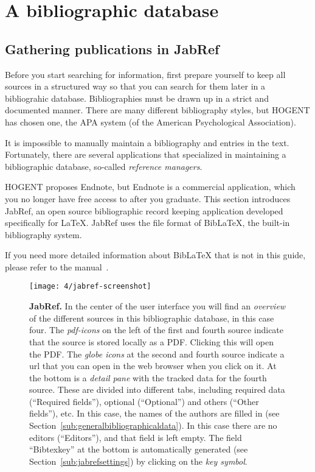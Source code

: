 \chapter{A bibliographic database}
\label{ch:bibliography}

\section{Gathering publications in JabRef}
\label{sec:publicationsjabref}

Before you start searching for information, first prepare yourself to keep all sources in a structured way so that you can search for them later in a bibliograhic database. Bibliographies must be drawn up in a strict and documented manner. There are many different bibliography styles, but HOGENT has chosen one, the APA system (of the American Psychological Association).

It is impossible to manually maintain a bibliography and entries in the text. Fortunately, there are several applications that specialized in maintaining a bibliographic database, so-called \emph{reference managers}.

HOGENT proposes Endnote, but Endnote is a commercial application, which you no longer have free access to after you graduate. This section introduces JabRef, an open source bibliographic record keeping application developed specifically for {\LaTeX}. JabRef uses the file format of Bib{\LaTeX}, the built-in bibliography system.

If you need more detailed information about Bib{\LaTeX} that is not in this guide, please refer to the manual~\autocite{LehmanEtAl2016}.

\begin{figure}
  \centering
  \texttt{[image: 4/jabref-screenshot]}
  \caption[JabRef]{\textbf{JabRef.} In the center of the user interface you will find an \emph{overview} of the different sources in this bibliographic database, in this case four. The \emph{pdf-icons} on the left of the first and fourth source indicate that the source is stored locally as a PDF. Clicking this will open the PDF. The \emph{globe icons} at the second and fourth source indicate a url that you can open in the web browser when you click on it. At the bottom is a \emph{detail pane} with the tracked data for the fourth source. These are divided into different tabs, including required data (``Required fields''), optional (``Optional'') and others (``Other fields''), etc. In this case, the names of the authors are filled in (see Section~\ref{sub:generalbibliographicaldata}). In this case there are no editors (``Editors''), and that field is left empty. The field ``Bibtexkey'' at the bottom is automatically generated (see Section~\ref{sub:jabrefsettings}) by clicking on the \emph{key symbol}.}
  \label{fig:jabref}
\end{figure}

